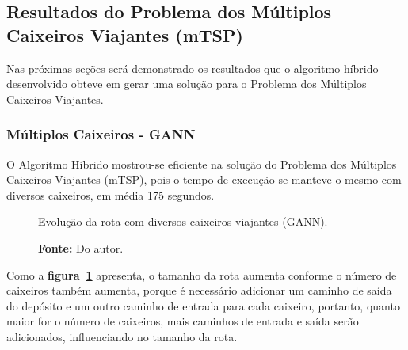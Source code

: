\documentclass[12pt,openright,a4paper,twoside]{tcc}
\begin{document}
        \newpage
		\subsection{Resultados do Problema dos Múltiplos Caixeiros Viajantes (mTSP)}	

        Nas próximas seções será demonstrado os resultados que o algoritmo híbrido desenvolvido obteve em gerar uma solução para o Problema dos Múltiplos Caixeiros Viajantes.

		\subsubsection{Múltiplos Caixeiros - GANN}
		
		O Algoritmo Híbrido mostrou-se eficiente na solução do Problema dos Múltiplos Caixeiros Viajantes (mTSP), pois o tempo de execução se manteve o mesmo com diversos caixeiros, em média 175 segundos.

		\begin{figure}[h]
			\centering
            \caption{Evolução da rota com diversos caixeiros viajantes (GANN).}
			\caption*{\textbf{Fonte:} Do autor.}
			\label{figmult}
		\end{figure}

        Como a \textbf{figura~\ref{figmult}} apresenta, o tamanho da rota aumenta conforme o número de caixeiros também aumenta, porque é necessário adicionar um caminho de saída do depósito e um outro caminho de entrada para cada caixeiro, portanto, quanto maior for o número de caixeiros, mais caminhos de entrada e saída serão adicionados, influenciando no tamanho da rota.
\end{document}
